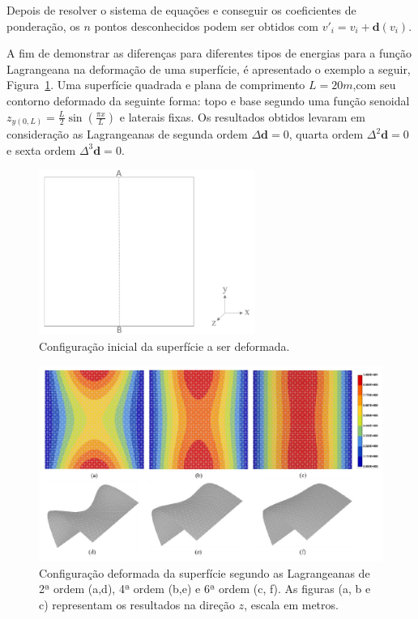 Depois de resolver o sistema de equações e conseguir os coeficientes de ponderação, os $n$ pontos desconhecidos podem ser obtidos com $v'_i=v_i+\boldsymbol{d}(v_i)$.

A fim de demonstrar as diferenças para diferentes tipos de energias para a função Lagrangeana na deformação de uma superfície, é apresentado o exemplo a seguir, Figura~\ref{fig-eg-surf-deformer-1}. Uma superfície quadrada e plana de comprimento $L=20m$,com seu contorno deformado da seguinte forma: topo e base segundo uma função senoidal $z_{y(0,L)}=\frac{L}{2}\sin(\frac{\pi x}{L})$ e laterais fixas. Os resultados obtidos levaram em consideração as Lagrangeanas de segunda ordem $\Delta\boldsymbol{d}=0$, quarta ordem $\Delta^2\boldsymbol{d}=0$ e sexta ordem $\Delta^3\boldsymbol{d}=0$.

\begin{figure} [H]
  \begin{center}
    \includegraphics[width=200pt]{images/fig-eg-surf-deformer-1}
    \caption{Configuração inicial da superfície a ser deformada.\cite{Muller}}\label{fig-eg-surf-deformer-1}
  \end{center}
\end{figure}


\begin{figure} [H]
  \begin{center}
    \includegraphics[width=\textwidth]{images/fig-eg-surf-deformer-2}
    \caption{Configuração deformada da superfície segundo as Lagrangeanas de 2ª ordem (a,d), 4ª ordem (b,e) e 6ª ordem (c, f). As figuras (a, b e c) representam os resultados na direção $z$, escala em metros.\cite{Muller}}\label{fig-eg-surf-deformer-2}
  \end{center}
\end{figure}

